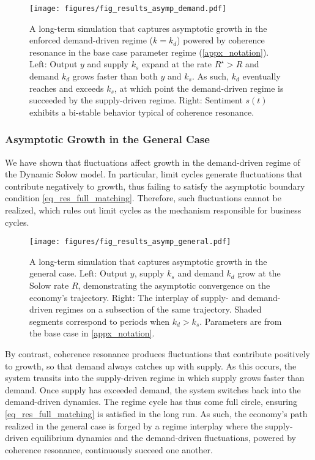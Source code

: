 \documentclass[authoryear, review]{elsarticle}
\begin{document}
\begin{figure}[htb]
    \centering
    \texttt{[image: figures/fig\_results\_asymp\_demand.pdf]}
    \caption{A long-term simulation that captures asymptotic growth in the enforced demand-driven regime ($k=k_d$) powered by coherence resonance in the base case parameter regime (\ref{appx_notation}). Left: Output $y$ and supply $k_s$ expand at the rate $R^\star>R$ and demand $k_d$ grows faster than both $y$ and $k_s$. As such, $k_d$ eventually reaches and exceeds $k_s$, at which point the demand-driven regime is succeeded by the supply-driven regime. Right: Sentiment $s(t)$ exhibits a bi-stable behavior typical of coherence resonance.}
    \label{fig_results_asymp_demand}
\end{figure}

\subsubsection{Asymptotic Growth in the General Case}\label{sec_results_asymp_gc}

We have shown that fluctuations affect growth in the demand-driven regime of the Dynamic Solow model. In particular, limit cycles generate fluctuations that contribute negatively to growth, thus failing to satisfy the asymptotic boundary condition \eqref{eq_res_full_matching}. Therefore, such fluctuations cannot be realized, which rules out limit cycles as the mechanism responsible for business cycles.  

\begin{figure}[htb]
    \centering
    \texttt{[image: figures/fig\_results\_asymp\_general.pdf]}
    \caption{A long-term simulation that captures asymptotic growth in the general case. Left: Output $y$, supply $k_s$ and demand $k_d$ grow at the Solow rate $R$, demonstrating the asymptotic convergence on the economy's trajectory. Right: The interplay of supply- and demand-driven regimes on a subsection of the same trajectory. Shaded segments correspond to periods when $k_d>k_s$. Parameters are from the base case in \ref{appx_notation}.}
    \label{fig_results_asymp_general}
\end{figure}

By contrast, coherence resonance produces fluctuations that contribute positively to growth, so that demand always catches up with supply. As this occurs, the system transits into the supply-driven regime in which supply grows faster than demand. Once supply has exceeded demand, the system switches back into the demand-driven dynamics. The regime cycle has thus come full circle, ensuring \eqref{eq_res_full_matching} is satisfied in the long run. As such, the economy's path realized in the general case is forged by a regime interplay where the supply-driven equilibrium dynamics and the demand-driven fluctuations, powered by coherence resonance, continuously succeed one another. 
\end{document}
